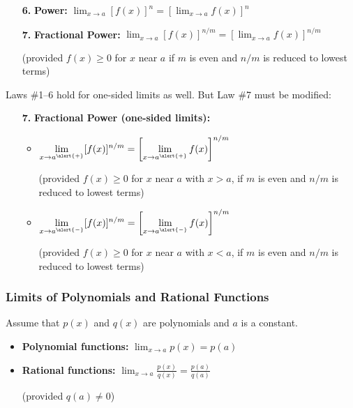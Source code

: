\documentclass[14pt]{beamer}
\begin{document}
\begin{frame}
\small
\begin{itemize}
\item[{\bf 6.}] {\bf Power:} $\displaystyle\lim_{x \to a} [f(x)]^n = \left[ \displaystyle\lim_{x \to a} f(x) \right]^n$

\vspace{0.75pc}
\item[{\bf 7.}] {\bf Fractional Power:} $\displaystyle\lim_{x \to a} [f(x)]^{n/m} = \left[ \displaystyle\lim_{x \to a} f(x) \right]^{n/m}$ 

\vspace{0.75pc}
(provided $f(x) \ge 0$ for $x$ near $a$ if $m$ is even and $n/m$ is reduced to lowest terms)
\end{itemize}
\end{frame}

\begin{frame}
\small
Laws \#1--6 hold for one-sided limits as well.  But Law \#7 must be modified:

\begin{itemize}
\item[{\bf 7.}] {\bf Fractional Power (one-sided limits):} 
	\begin{itemize}
	\item $\displaystyle\lim_{x \to a^{\alert{+}}} [f(x)]^{n/m} = \left[ \displaystyle\lim_{x \to a^{\alert{+}}} f(x) \right]^{n/m}$

	\vspace{0.25pc}
	(provided $f(x) \ge 0$ for $x$ near $a$ \alert{with $x>a$}, if $m$ is even and $n/m$ is reduced to lowest terms)
	
	\vspace{0.75pc}
	\item $\displaystyle\lim_{x \to a^{\alert{-}}} [f(x)]^{n/m} = \left[ \displaystyle\lim_{x \to a^{\alert{-}}} f(x) \right]^{n/m}$ 
	
	\vspace{0.25pc}
	(provided $f(x) \ge 0$ for $x$ near $a$ \alert{with $x<a$}, if $m$ is even and $n/m$ is reduced to lowest terms)
	\end{itemize}
\end{itemize}
\end{frame}

\begin{frame}
\frametitle{\large Limits of Polynomials and Rational Functions}
\small
Assume that $p(x)$ and $q(x)$ are polynomials and $a$ is a constant.
\begin{itemize}
\item {\bf Polynomial functions:}  $\displaystyle\lim_{x \to a} p(x) = p(a)$

\vspace{0.75pc}
\item {\bf Rational functions:}  $\displaystyle\lim_{x \to a} \frac{p(x)}{q(x)} = \frac{p(a)}{q(a)}$ 

\vspace{0.5pc}
(provided $q(a) \ne 0$)
\end{itemize}
\end{frame}
\end{document}
